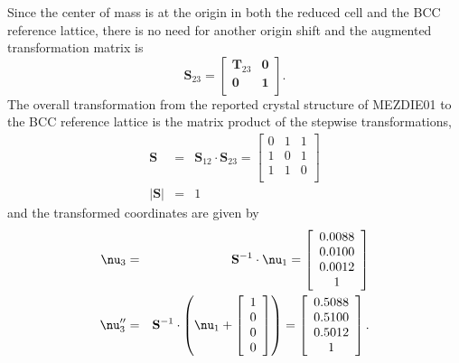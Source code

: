 \documentclass{iucr}              %
\begin{document}
Since the center of mass is at the origin in both the reduced cell and the BCC reference lattice, there is no need for another origin shift and the augmented transformation matrix is
\begin{equation}
   \mathbf{S}_{23}=\left[
     \begin{array}{cc}
        \mathbf{T}_{23}& \mathbf{0}\\
        \mathbf{0}& \mathbf{1}\\
     \end{array}
  \right].
\end{equation}
The overall transformation from the reported crystal structure of MEZDIE01 to the BCC reference lattice is the matrix product of the stepwise transformations,
\begin{eqnarray}
   \mathbf{S}&=&\mathbf{S}_{12}\cdot\mathbf{S}_{23}=\left[
     \begin{array}{ccc}
        0& 1& 1\\
        1& 0& 1\\
        1& 1& 0\\
     \end{array}
  \right]\\
   \vert\mathbf{S}\vert&=&1
\end{eqnarray}
and the transformed coordinates are given by
\begin{eqnarray}
   \mbox{\boldmath$\nu$}_{3}&=&\mathbf{S}^{-1}\cdot
\mbox{\boldmath$\nu$}_{1}
=\left[
     \begin{array}{c}
        0.0088\\
        0.0100\\
        0.0012\\
	1\\
     \end{array}
  \right]\\
   \mbox{\boldmath$\nu$}_{3}^{\prime\prime}&=&\mathbf{S}^{-1}\cdot
\left(\mbox{\boldmath$\nu$}_{1}+\left[\begin{array}{c}1\\
0\\
0\\
0\end{array}\right]\right)=\left[
     \begin{array}{c}
        0.5088\\
        0.5100\\
        0.5012\\
	1\\
     \end{array}
  \right].
\end{eqnarray}
\end{document}
